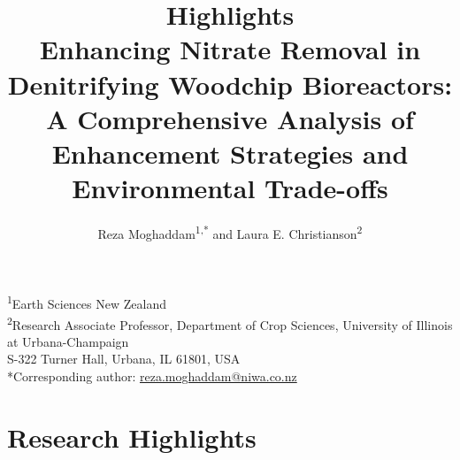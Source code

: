 \documentclass[12pt,a4paper]{article}
\title{\textbf{Highlights}\\
\large Enhancing Nitrate Removal in Denitrifying Woodchip Bioreactors: A Comprehensive Analysis of Enhancement Strategies and Environmental Trade-offs}
\author{Reza Moghaddam\textsuperscript{1,*} and Laura E. Christianson\textsuperscript{2}}
\date{}
\begin{document}
\maketitle

\begin{center}
\footnotesize
\textsuperscript{1}Earth Sciences New Zealand\\
\textsuperscript{2}Research Associate Professor, Department of Crop Sciences, University of Illinois at Urbana-Champaign\\
S-322 Turner Hall, Urbana, IL 61801, USA\\
*Corresponding author: \href{mailto:reza.moghaddam@niwa.co.nz}{reza.moghaddam@niwa.co.nz}
\end{center}

\vspace{1cm}

\section*{Research Highlights}
\end{document}
